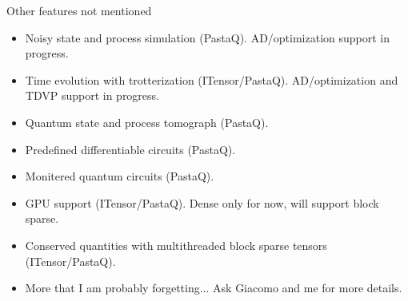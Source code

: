 \begin{frame}{Other features not mentioned}

\begin{itemize}[<+->]

  \item Noisy state and process simulation (PastaQ). AD/optimization support in progress.
  \item Time evolution with trotterization (ITensor/PastaQ). AD/optimization and TDVP support in progress.
  \item Quantum state and process tomograph (PastaQ).
  \item Predefined differentiable circuits (PastaQ).
  \item Monitered quantum circuits (PastaQ).
  \item GPU support (ITensor/PastaQ). Dense only for now, will support block sparse.
  \item Conserved quantities with multithreaded block sparse tensors (ITensor/PastaQ).
  \item More that I am probably forgetting... Ask Giacomo and me for more details.

\end{itemize}

\end{frame}
